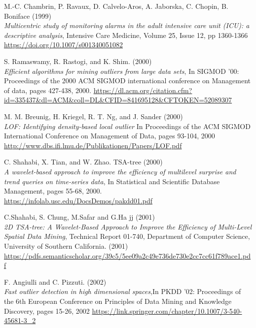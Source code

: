 \documentclass[12pt,a4paper]{article}
\begin{document}
\begin{thebibliography}{9}
M.-C. Chambrin, P. Ravaux, D. Calvelo-Aros, A. Jaborska, C. Chopin, B. Boniface (1999)\\
\textit{Multicentric study of monitoring alarms in the adult intensive care unit (ICU): a descriptive analysis},
Intensive Care Medicine, Volume 25, Issue 12, pp 1360-1366\\
\url{https://doi.org/10.1007/s001340051082}

S. Ramaswamy, R. Rastogi, and K. Shim. (2000)\\
\textit{Efficient algorithms for mining outliers from large data sets}, In
SIGMOD '00: Proceedings of the 2000 ACM SIGMOD international conference on Management of
data, pages 427-438, 2000.
\url{https://dl.acm.org/citation.cfm?id=335437&dl=ACM&coll=DL&CFID=841695128&CFTOKEN=52089307}

M. M. Breunig, H. Kriegel, R. T. Ng, and J. Sander (2000)\\
\textit{LOF: Identifying density-based local outlier}
In Proceedings of the ACM SIGMOD International Conference on Management of Data, pages 93-104, 2000\\
\url{http://www.dbs.ifi.lmu.de/Publikationen/Papers/LOF.pdf}

C. Shahabi, X. Tian, and W. Zhao. TSA-tree (2000)\\
\textit{A wavelet-based approach to improve the efficiency of multilevel surprise and trend queries on time-series data},
In Statistical and Scientific Database Management, pages 55-68, 2000.\\
\url{https://infolab.usc.edu/DocsDemos/pakdd01.pdf}

C.Shahabi, S. Chung, M.Safar and G.Ha jj (2001)\\
\textit{2D TSA-tree: A Wavelet-Based Approach to Improve the Efficiency of Multi-Level Spatial Data Mining},
Technical Report 01-740, Department of Computer Science, University of Southern California. (2001)\\
\url{https://pdfs.semanticscholar.org/39c5/5ee09a2c49e736de730e2cc7cc61f789ace1.pdf}

F. Angiulli and C. Pizzuti. (2002)\\
\textit{Fast outlier detection in high dimensional spaces},In PKDD '02: Proceedings
of the 6th European Conference on Principles of Data Mining and Knowledge Discovery, pages 15-26,
2002
\url{https://link.springer.com/chapter/10.1007/3-540-45681-3_2}


\end{thebibliography}
\end{document}
